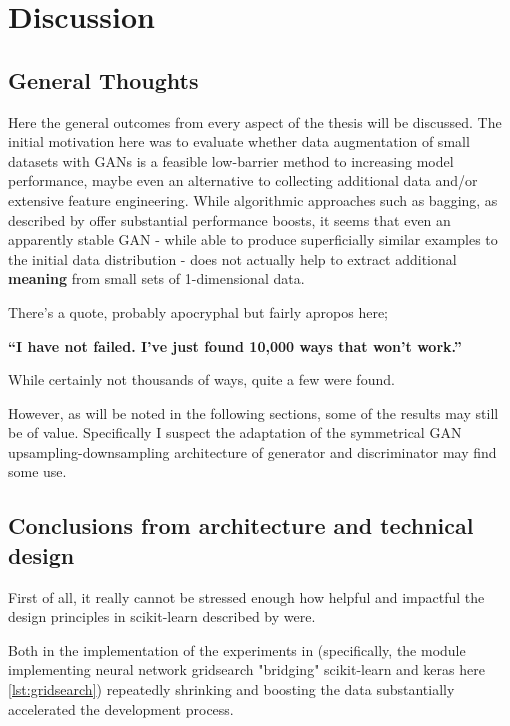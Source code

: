 \chapter{Discussion}

\section{General Thoughts}

Here the general outcomes from every aspect of the thesis will be discussed.
The initial motivation here was to evaluate whether data augmentation of small datasets with \acp{GAN} is a feasible low-barrier method to increasing model performance, maybe even an alternative to collecting additional data and/or extensive feature engineering.
While algorithmic approaches such as \ac{bagging}, as described by \cite{bagging} offer substantial performance boosts, it seems that even an apparently stable \ac{GAN} - while able to produce superficially similar examples to the initial data distribution - does not actually help to extract additional \textbf{meaning} from small sets of 1-dimensional data.

There's a quote, probably apocryphal but fairly apropos here;

\begin{center} 
	
	\textbf{“I have not failed. I’ve just found 10,000 ways that won’t work.”}
	
\end{center}

While certainly not thousands of ways, quite a few were found.

However, as will be noted in the following sections, some of the results may still be of value. Specifically I suspect the adaptation of the symmetrical \ac{GAN} upsampling-downsampling architecture of generator and discriminator may find some use.

\pagebreak

\section{Conclusions from architecture and technical design}

First of all, it really cannot be stressed enough how helpful and impactful the design principles in scikit-learn described by \cite{buitinck2013api} were. 

Both in the implementation of the experiments in (specifically, the module implementing neural network gridsearch "bridging" scikit-learn and keras here \ref{lst:gridsearch}) repeatedly shrinking and boosting the data substantially accelerated the development process.

